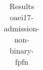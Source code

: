 \begin{table}[htb]
{\begin{tabular}[tb]{llllllllllllllllllllllllllllllllllllllll}
\end{tabular}

}

\caption{Results oaei17-admission-non-binary-fpfn}

\label{tbl:results}

\end{table}